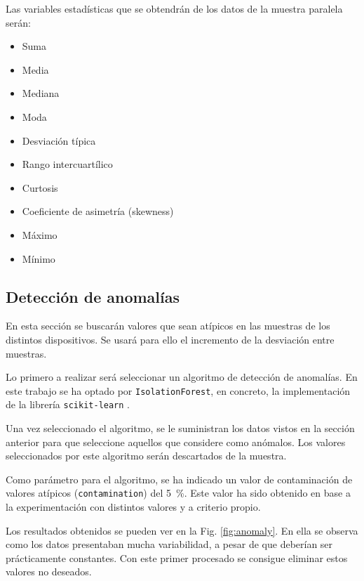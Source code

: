Las variables estadísticas que se obtendrán de los datos de la muestra paralela serán:
\begin{multicols}{2}
    \begin{itemize}
        \item Suma
        \item Media
        \item Mediana
        \item Moda
        \item Desviación típica
        \item Rango intercuartílico
        \item Curtosis
        \item Coeficiente de asimetría (skewness)
        \item Máximo
        \item Mínimo
    \end{itemize}
\end{multicols}

\iffalse
\subsection{Detección de anomalías}

En esta sección se buscarán valores que sean atípicos en las muestras de los distintos dispositivos. Se usará para ello el incremento de la desviación entre muestras. 

Lo primero a realizar será seleccionar un algoritmo de detección de anomalías. En este trabajo se ha optado por \texttt{IsolationForest}, en concreto, la implementación de la librería \texttt{scikit-learn} \cite{scikitisolation}.

Una vez seleccionado el algoritmo, se le suministran los datos vistos en la sección anterior para que seleccione aquellos que considere como anómalos. Los valores seleccionados por este algoritmo serán descartados de la muestra.

Como parámetro para el algoritmo, se ha indicado un valor de contaminación de valores atípicos (\texttt{contamination}) del \SI{5}{\percent}. Este valor ha sido obtenido en base a la experimentación con distintos valores y a criterio propio.

Los resultados obtenidos se pueden ver en la Fig. \ref{fig:anomaly}. En ella se observa como los datos presentaban mucha variabilidad, a pesar de que deberían ser prácticamente constantes. Con este primer procesado se consigue eliminar estos valores no deseados.

